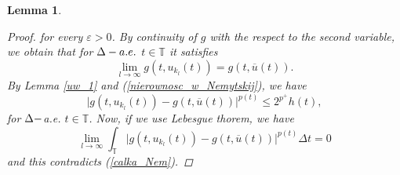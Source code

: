 \documentclass[12pt,a4paper,oneside,titlepage]{article}
\newtheorem{Lemat}{Lemma}
\renewcommand{\epsilon}{\varepsilon}
\begin{document}
\begin{Lemat}
\begin{proof}
for every $\epsilon>0$. By continuity of $g$ with the respect to the second variable, we obtain that for $\Delta \-- a.e.$ $t \in \mathbb{T}$ it satisfies
\begin{equation}
\nonumber
\lim_{l \rightarrow \infty} g(t, u_{k_l}(t)) = g(t,\overline{u}(t)).
\end{equation} 
By Lemma \ref{uw_1} and (\ref{nierownosc_w_Nemytskij}), we have
 \begin{equation}
 \nonumber
 \vert g(t,u_{k_l}(t)) - g(t,\overline{u}(t)) \vert^{p(t)} \leq 2^{p^+} h(t),
 \end{equation}
 for $\Delta \-- $a.e. $t \in \mathbb{T}$. Now, if we use Lebesgue thorem, we have
 \begin{equation}
 \lim_{l \rightarrow \infty} \int_{\mathbb{T}} \vert g(t, u_{k_l}(t)) - g(t,\overline{u}(t)) \vert^{p(t)} \Delta t =0
 \end{equation}
 and this contradicts (\ref{calka_Nem}).
 \end{proof}
\end{Lemat}
\end{document}
